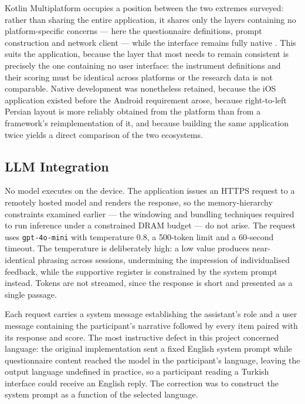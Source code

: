 Kotlin Multiplatform occupies a position between the two extremes surveyed: rather than sharing
the entire application, it shares only the layers containing no platform-specific concerns ---
here the questionnaire definitions, prompt construction and network client --- while the
interface remains fully native \cite{kmp}. This suits the application, because the layer that
most needs to remain consistent is precisely the one containing no user interface: the
instrument definitions and their scoring must be identical across platforms or the research
data is not comparable. Native development was nonetheless retained, because the iOS
application existed before the Android requirement arose, because right-to-left Persian layout
is more reliably obtained from the platform than from a framework's reimplementation of it, and
because building the same application twice yields a direct comparison of the two ecosystems.

\subsection{LLM Integration}

No model executes on the device. The application issues an HTTPS request to a remotely hosted
model and renders the response, so the memory-hierarchy constraints examined earlier --- the
windowing and bundling techniques required to run inference under a constrained DRAM budget ---
do not arise. The request uses \texttt{gpt-4o-mini} with temperature 0.8, a 500-token limit and
a 60-second timeout. The temperature is deliberately high: a low value produces near-identical
phrasing across sessions, undermining the impression of individualised feedback, while the
supportive register is constrained by the system prompt instead. Tokens are not streamed, since
the response is short and presented as a single passage.

Each request carries a system message establishing the assistant's role and a user message
containing the participant's narrative followed by every item paired with its response and
score. The most instructive defect in this project concerned language: the original
implementation sent a fixed English system prompt while questionnaire content reached the model
in the participant's language, leaving the output language undefined in practice, so a
participant reading a Turkish interface could receive an English reply. The correction was to
construct the system prompt as a function of the selected language.

